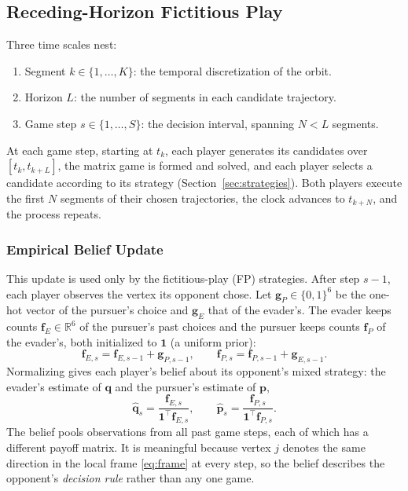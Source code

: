 
\subsection{Receding-Horizon Fictitious Play}

Three time scales nest:
%
\begin{enumerate}
    \item Segment $k \in \{1, \dots, K\}$: the temporal discretization of the orbit.
    \item Horizon $L$: the number of segments in each candidate trajectory.
    \item Game step $s \in \{1, \dots, S\}$: the decision interval, spanning $N < L$ segments.
\end{enumerate}
%
At each game step, starting at $t_k$, each player generates its candidates over $[t_k, t_{k+L}]$, the matrix game is formed and solved, and each player selects a candidate according to its strategy (Section~\ref{sec:strategies}). Both players execute the first $N$ segments of their chosen trajectories, the clock advances to $t_{k+N}$, and the process repeats.

\subsubsection{Empirical Belief Update}

This update is used only by the fictitious-play (FP) strategies. After step $s-1$, each player observes the vertex its opponent chose. Let $\mathbf{g}_P \in \{0,1\}^6$ be the one-hot vector of the pursuer's choice and $\mathbf{g}_E$ that of the evader's. The evader keeps counts $\mathbf{f}_E \in \mathbb{R}^6$ of the pursuer's past choices and the pursuer keeps counts $\mathbf{f}_P$ of the evader's, both initialized to $\mathbf{1}$ (a uniform prior):
%
\begin{equation}
    \mathbf{f}_{E,s} = \mathbf{f}_{E,s-1} + \mathbf{g}_{P,s-1}, \qquad
    \mathbf{f}_{P,s} = \mathbf{f}_{P,s-1} + \mathbf{g}_{E,s-1} .
\end{equation}
%
Normalizing gives each player's belief about its opponent's mixed strategy: the evader's estimate of $\mathbf{q}$ and the pursuer's estimate of $\mathbf{p}$,
%
\begin{equation}
    \hat{\mathbf{q}}_s = \frac{\mathbf{f}_{E,s}}{\mathbf{1}^\top \mathbf{f}_{E,s}}, \qquad
    \hat{\mathbf{p}}_s = \frac{\mathbf{f}_{P,s}}{\mathbf{1}^\top \mathbf{f}_{P,s}} .
    \label{eq:belief}
\end{equation}
%
The belief pools observations from all past game steps, each of which has a different payoff matrix. It is meaningful because vertex $j$ denotes the same direction in the local frame \eqref{eq:frame} at every step, so the belief describes the opponent's \emph{decision rule} rather than any one game.

